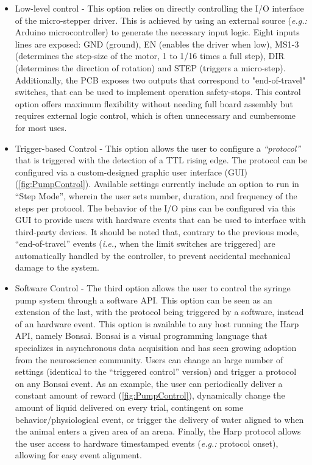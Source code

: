 \begin{itemize}

\item{Low-level control} - This option relies on directly controlling the I/O interface of the micro-stepper driver. This is achieved by using an external source (\textit{e.g.:} Arduino microcontroller) to generate the necessary input logic. Eight inputs lines are exposed: GND (ground), EN (enables the driver when low), MS1-3 (determines the step-size of the motor, 1 to 1/16 times a full step), DIR (determines the direction of rotation) and STEP (triggers a micro-step). Additionally, the PCB exposes two outputs that correspond to "end-of-travel" switches, that can be used to implement operation safety-stops. This control option offers maximum flexibility without needing full board assembly but requires external logic control, which is often unnecessary and cumbersome for most uses.


\item{Trigger-based Control} - This option allows the user to configure a \textit{“protocol”} that is triggered with the detection of a TTL rising edge. The protocol can be configured via a custom-designed graphic user interface (GUI) (\cref{fig:PumpControl}). Available settings currently include an option to run in “Step Mode”, wherein the user sets number, duration, and frequency of the steps per protocol. The behavior of the I/O pins can be configured via this GUI to provide users with hardware events that can be used to interface with third-party devices.
It should be noted that, contrary to the previous mode, “end-of-travel” events (\textit{i.e.,} when the limit switches are triggered) are automatically handled by the controller, to prevent accidental mechanical damage to the system.

\item{Software Control} - The third option allows the user to control the syringe pump system through a software API. This option can be seen as an extension of the last, with the protocol being triggered by a software, instead of an hardware event. This option is available to any host running the Harp API, namely Bonsai. Bonsai is a visual programming language that specializes in asynchronous data acquisition and has seen growing adoption from the neuroscience community. Users can change an large number of settings (identical to the “triggered control” version) and trigger a protocol on any Bonsai event. As an example, the user can periodically deliver a constant amount of reward (\cref{fig:PumpControl}), dynamically change the amount of liquid delivered on every trial, contingent on some behavior/physiological event, or trigger the delivery of water aligned to when the animal enters a given area of an arena.
Finally, the Harp protocol allows the user access to hardware timestamped events (\textit{e.g.:} protocol onset), allowing for easy event alignment.


\end{itemize}
